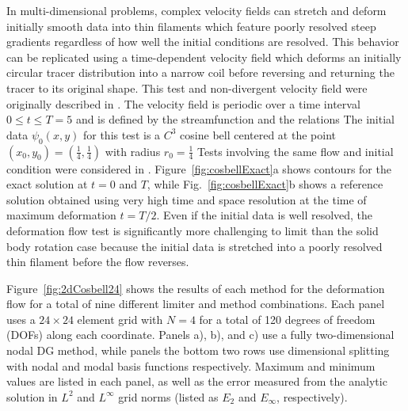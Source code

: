 \documentclass{ametsoc}
\begin{document}
In multi-dimensional problems, complex velocity fields can stretch and deform initially smooth data into thin filaments which feature poorly resolved steep gradients regardless of how well the initial conditions are resolved. This behavior can be replicated using a time-dependent velocity field which deforms an initially circular tracer distribution into a narrow coil before reversing and returning the tracer to its original shape. This test and non-divergent velocity field were originally described in \citep{LeVeque1996}. The velocity field is periodic over a time interval $0 \leq t \leq T=5$ and is defined by the streamfunction
and the relations
The initial data $\psi_0(x,y)$ for this test is a $C^3$ cosine bell centered at the point $(x_0,y_0) = (\frac{1}{4},\frac{1}{4})$ with radius $r_0 = \frac{1}{4}$
Tests involving the same flow and initial condition were considered in \citep{ullrich2014}. Figure~\ref{fig:cosbellExact}a shows contours for the exact solution at $t=0$ and $T$, while Fig.~\ref{fig:cosbellExact}b shows a reference solution obtained using very high time and space resolution at the time of maximum deformation $t=T/2$. Even if the initial data is well resolved, the deformation flow test is significantly more challenging to limit than the solid body rotation case because the initial data is stretched into a poorly resolved thin filament before the flow reverses. 

Figure~\ref{fig:2dCosbell24} shows the results of each method for the deformation flow for a total of nine different limiter and method combinations. Each panel uses a $24 \times 24$ element grid with $N=4$ for a total of 120 degrees of freedom (DOFs) along each coordinate. Panels a), b), and c) use a fully two-dimensional nodal DG method, while panels the bottom two rows use dimensional splitting with nodal and modal basis functions respectively. Maximum and minimum values are listed in each panel, as well as the error measured from the analytic solution in $L^2$ and $L^{\infty}$ grid norms (listed as $E_2$ and $E_{\infty}$, respectively).
\end{document}
